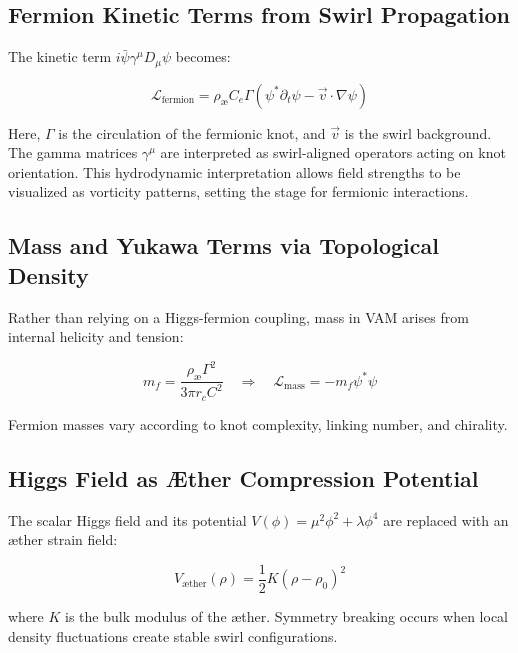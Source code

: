\subsection{Fermion Kinetic Terms from Swirl Propagation}

The kinetic term $i\bar{\psi}\gamma^\mu D_\mu \psi$ becomes:

\begin{equation}
\mathcal{L}_{\text{fermion}} = \rho_{\text{\ae}} C_e \Gamma \left( \psi^* \partial_t \psi - \vec{v} \cdot \nabla \psi \right)
\end{equation}

Here, $\Gamma$ is the circulation of the fermionic knot, and $\vec{v}$ is the swirl background. The gamma matrices $\gamma^\mu$ are interpreted as swirl-aligned operators acting on knot orientation. This hydrodynamic interpretation allows field strengths to be visualized as vorticity patterns, setting the stage for fermionic interactions.

\subsection{Mass and Yukawa Terms via Topological Density}

Rather than relying on a Higgs-fermion coupling, mass in VAM arises from internal helicity and tension:

\begin{equation}
m_f = \frac{\rho_{\text{\ae}} \Gamma^2}{3\pi r_c C^2}
\quad \Rightarrow \quad
\mathcal{L}_{\text{mass}} = -m_f \psi^* \psi
\end{equation}

Fermion masses vary according to knot complexity, linking number, and chirality.

\subsection{Higgs Field as Æther Compression Potential}

The scalar Higgs field and its potential $V(\phi) = \mu^2 \phi^2 + \lambda \phi^4$ are replaced with an æther strain field:

\begin{equation}
V_{\text{æther}}(\rho) = \frac{1}{2}K(\rho - \rho_0)^2
\end{equation}

where $K$ is the bulk modulus of the æther. Symmetry breaking occurs when local density fluctuations create stable swirl configurations.

